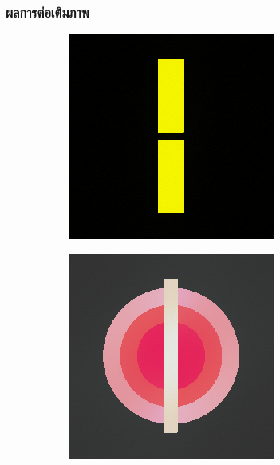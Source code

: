 \documentclass[xcolor=dvipsnames, xetex,serif]{beamer}
\numberwithin{equation}{section}
\begin{document}
    \begin{frame}
        \frametitle{ผลการต่อเติมภาพ}
        \begin{figure}[H]
            \centering
            \begin{subfigure}{0.15\linewidth}
                \centering
                \includegraphics[width=0.9\linewidth]{images/result_ex1/timemarch01.png}
            \end{subfigure}
            \begin{subfigure}{0.15\linewidth}
                \centering
                \includegraphics[width=0.9\linewidth]{images/result_ex1/timemarch02.png}

\end{subfigure}
\end{figure}
\end{frame}
\end{document}
